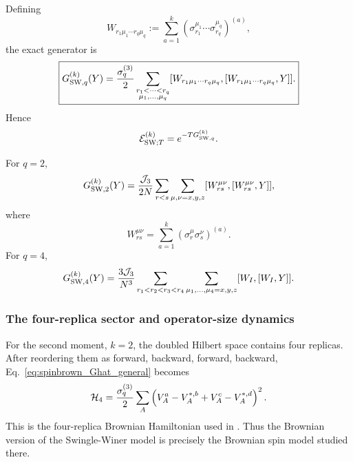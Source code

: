 \documentclass{article}
\theoremstyle{definition}
\begin{document}
Defining
\begin{equation}
    W_{r_1\mu_1\cdots r_q\mu_q}
    :=
    \sum_{a=1}^k
    \left(
      \sigma_{r_1}^{\mu_1}\cdots
      \sigma_{r_q}^{\mu_q}
    \right)^{(a)},
\end{equation}
the exact generator is
\begin{equation}
    \boxed{
    G_{{\rm SW},q}^{(k)}(Y)
    =
    \frac{\sigma_q^{(3)}}{2}
    \sum_{\substack{r_1<\cdots<r_q\\
                    \mu_1,\ldots,\mu_q}}
    [W_{r_1\mu_1\cdots r_q\mu_q},
     [W_{r_1\mu_1\cdots r_q\mu_q},Y]] .
    }
    \label{eq:spinbrown_SW_Gq}
\end{equation}
Hence
\begin{equation}
    {\cal E}_{{\rm SW};T}^{(k)}
    =
    e^{-T G_{{\rm SW},q}^{(k)}} .
    \label{eq:spinbrown_SW_semigroup}
\end{equation}

For $q=2$,
\begin{equation}
    G_{{\rm SW},2}^{(k)}(Y)
    =
    \frac{{\cal J}_3}{2N}
    \sum_{r<s}
    \sum_{\mu,\nu=x,y,z}
    [W_{rs}^{\mu\nu},
     [W_{rs}^{\mu\nu},Y]],
    \label{eq:spinbrown_SW_q2}
\end{equation}
where
\begin{equation}
    W_{rs}^{\mu\nu}
    =
    \sum_{a=1}^k
    (\sigma_r^\mu\sigma_s^\nu)^{(a)}.
\end{equation}
For $q=4$,
\begin{equation}
    G_{{\rm SW},4}^{(k)}(Y)
    =
    \frac{3{\cal J}_3}{N^3}
    \sum_{r_1<r_2<r_3<r_4}
    \sum_{\mu_1,\ldots,\mu_4=x,y,z}
    [W_I,[W_I,Y]] .
    \label{eq:spinbrown_SW_q4}
\end{equation}


\subsubsection{The four-replica sector and operator-size dynamics}

For the second moment, $k=2$, the doubled Hilbert space contains four
replicas.  After reordering them as forward, backward, forward, backward,
Eq.~\eqref{eq:spinbrown_Ghat_general} becomes
\begin{equation}
    {\cal H}_{4}
    =
    \frac{\sigma_q^{(3)}}{2}
    \sum_A
    \left(
       V_A^{a}
       -
       V_A^{*,b}
       +
       V_A^{c}
       -
       V_A^{*,d}
    \right)^2.
    \label{eq:spinbrown_SW_four_replica}
\end{equation}
This is the four-replica Brownian Hamiltonian used in
\cite{Xu2024}.  Thus the Brownian version of the Swingle-Winer model is
precisely the Brownian spin model studied there.
\end{document}
